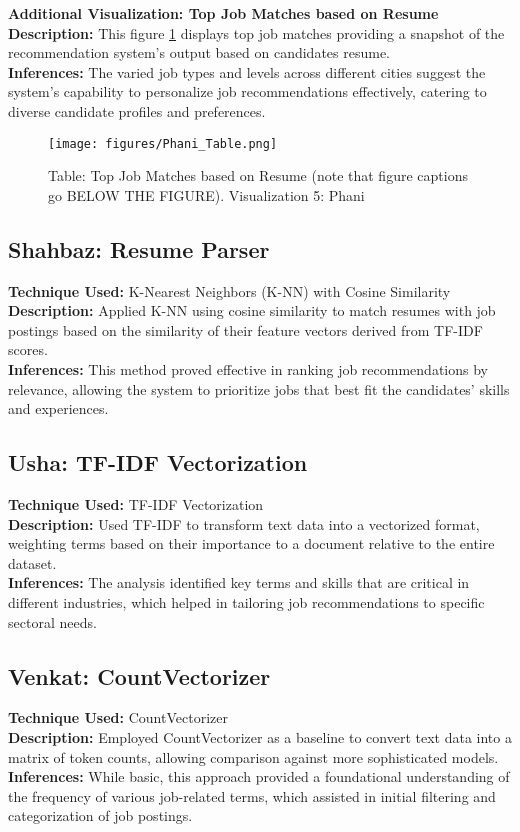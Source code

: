 \documentclass[a4paper,10pt]{article}
\begin{document}
\textbf{Additional Visualization: Top Job Matches based on Resume}\\
\textbf{Description:} This figure \ref{fig_table} displays top job matches providing a snapshot of the recommendation system’s output based on candidates resume.\\
\textbf{Inferences:} The varied job types and levels across different cities suggest the system's capability to personalize job recommendations effectively, catering to diverse candidate profiles and preferences.

 \begin{figure}[ht]
    \centering
    \texttt{[image: figures/Phani\_Table.png]}
    \caption{Table: Top Job Matches based on Resume (note that figure captions go BELOW THE FIGURE). Visualization 5: Phani}
    \label{fig_table}
    \end{figure}

\subsection{Shahbaz: Resume Parser}
\textbf{Technique Used:} K-Nearest Neighbors (K-NN) with Cosine Similarity\\
\textbf{Description:} Applied K-NN using cosine similarity to match resumes with job postings based on the similarity of their feature vectors derived from TF-IDF scores.\\
\textbf{Inferences:} This method proved effective in ranking job recommendations by relevance, allowing the system to prioritize jobs that best fit the candidates' skills and experiences.

\subsection{Usha: TF-IDF Vectorization}
\textbf{Technique Used:} TF-IDF Vectorization\\
\textbf{Description:} Used TF-IDF to transform text data into a vectorized format, weighting terms based on their importance to a document relative to the entire dataset.\\
\textbf{Inferences:} The analysis identified key terms and skills that are critical in different industries, which helped in tailoring job recommendations to specific sectoral needs.

\subsection{Venkat: CountVectorizer}
\textbf{Technique Used:} CountVectorizer\\
\textbf{Description:} Employed CountVectorizer as a baseline to convert text data into a matrix of token counts, allowing comparison against more sophisticated models.\\
\textbf{Inferences:} While basic, this approach provided a foundational understanding of the frequency of various job-related terms, which assisted in initial filtering and categorization of job postings.
\end{document}

